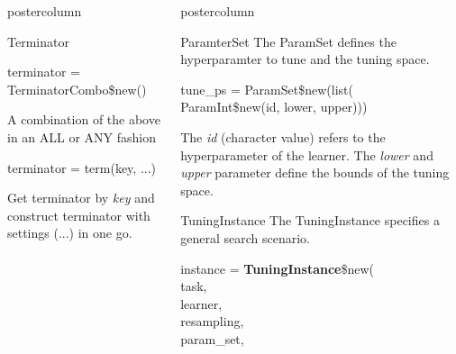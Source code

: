 \documentclass{beamer}
\newlength{\columnheight} %
\begin{document}
\begin{frame}[fragile]{}
\begin{columns}
\begin{column}{.245\textwidth}
\begin{beamercolorbox}[center]{postercolumn}
\begin{minipage}{.98\textwidth}
{\begin{myblock}{Terminator}
						\\
						\begin{codebox}
							terminator = TerminatorCombo\$new()
						\end{codebox}
						A combination of the above in an ALL or ANY fashion
						\\
						\begin{codebox}
							terminator = term(key, ...)
						\end{codebox}
						Get terminator by \textit{key} and construct terminator with settings (...) in one go. 
					\end{myblock}	
					\vfill}
				\end{minipage}
			\end{beamercolorbox}
		\end{column}
		\begin{column}{.245\textwidth}
			\begin{beamercolorbox}[center]{postercolumn}
				\begin{minipage}{.98\textwidth}
					\parbox[t][\columnheight]{\textwidth}{
						\begin{myblock}{ParamterSet}
						The ParamSet defines the hyperparamter to tune and the tuning space.
							\\
							\begin{codeboxmultiline}[width=18cm]
							tune\_ps = ParamSet\$new(list(\\
							\hspace*{1ex}ParamInt\$new(id, lower, upper)))
						\end{codeboxmultiline}
					The \textit{id} (character value) refers to the hyperparameter of the learner. The \textit{lower} and \textit{upper} parameter define the bounds of the tuning space. 	
						\end{myblock}	
					\begin{myblock}{TuningInstance}
						The TuningInstance specifies a general search scenario.
						\\
						\begin{codeboxmultiline}[width=18cm]
							instance = \textbf{TuningInstance}\$new(\\
							\hspace*{1ex}task,\\
							\hspace*{1ex}learner,\\
							\hspace*{1ex}resampling,\\
							\hspace*{1ex}param\_set,\\

\end{codeboxmultiline}
\end{myblock}}
\end{minipage}
\end{beamercolorbox}
\end{column}
\end{columns}
\end{frame}
\end{document}
